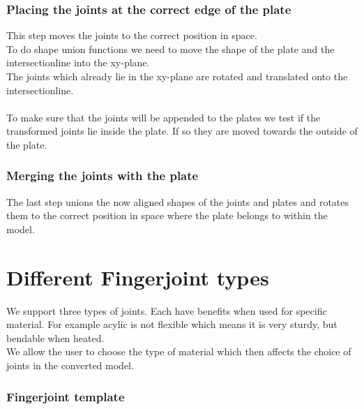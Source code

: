 \documentclass[../ClassicThesis.tex]{subfiles}
\begin{document}
\subsubsection*{Placing the joints at the correct edge of the plate}
This step moves the joints to the correct position in space. 
\*\\
To do shape union functions we need to move the shape of the plate and the intersectionline into the xy-plane.
\*\\
The joints which already lie in the xy-plane are rotated and translated onto the intersectionline.\\
\*\\
To make sure that the joints will be appended to the plates we test if the transformed joints lie inside the plate. If so they are moved towards the outside of the plate.
            
\subsubsection*{Merging the joints with the plate}
The last step unions the now aligned shapes of the joints and plates and rotates them to the correct position in space where the plate belongs to within the model.


\section{Different Fingerjoint types}
We support three types of joints. Each have benefits when used for specific material. For example acylic is not flexible which means it is very sturdy, but bendable when heated. \\
We allow the user to choose the type of material which then affects the choice of joints in the converted model.

\subsubsection{Fingerjoint template}
\end{document}
